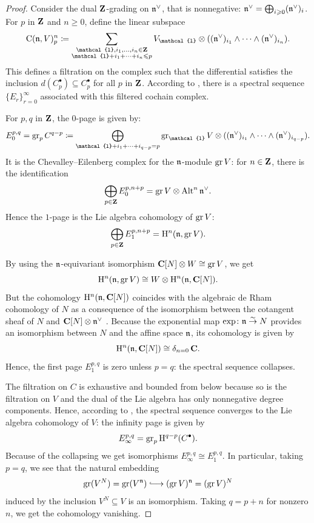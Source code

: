 \begin{proof}
	Consider the dual $\mathbf{Z}$-grading on $\mathfrak n^\vee$, that is nonnegative: $\mathfrak n^\vee = \bigoplus_{i \geqslant 0} (\mathfrak n^\vee)_i$. For $p$ in $\mathbf{Z}$ and $n \geqslant 0$, define the linear subspace
	$$ \Cpx(\n, V)^n_p \coloneqq \sum_{\substack{\mathcal{l}, i_1, \dots, i_n \in \Z \\ \mathcal{l} + i_1 + \cdots + i_n \leqslant p}} V_{\mathcal{l}} \otimes ((\n^\vee)_{i_1} \wedge \cdots\wedge (\n^\vee)_{i_n}). $$ 
	This defines a filtration on the complex such that the differential satisfies the inclusion $d(C^\bullet_p) \subseteq C^\bullet_p$ for all $p$ in $\mathbf{Z}$. According to \cite[Section~5.4]{weibel1994introduction}, there is a spectral sequence~$\{E_{r}\}_{r=0}^\infty$ associated with this filtered cochain complex.	
	
	For $p, q$ in $\mathbf{Z}$, the $0$-page is given by:
	$$ E_0^{p, q} = \gr_p C^{q-p} \coloneqq \bigoplus_{\mathcal{l} + i_1 + \cdots + i_{q-p} = p} \gr_\mathcal{l} V \otimes ((\n^\vee)_{i_1} \wedge \cdots\wedge(\n^\vee)_{i_{q-p}}). $$
	It is the Chevalley--Eilenberg complex for the $\mathfrak n$-module $\operatorname{gr} V$: for $n \in \mathbf{Z}$, there is the identification
	$$ \bigoplus_{p \in \mathbf{Z}}  E_0^{p, n+p} = \operatorname{gr} V \otimes \operatorname{Alt}^n \mathfrak n^\vee. $$
	Hence the $1$-page is the Lie algebra cohomology of $\operatorname{gr} V$:
	$$  \bigoplus_{p \in \mathbf{Z}}  E_1^{p, n+p} = \mathrm{H}^{n}(\mathfrak n, \operatorname{gr} V). $$ 
	
	By using the $\mathfrak n$-equivariant isomorphism $\mathbf{C}[N] \otimes W \cong \operatorname{gr} V$, we get
	$$ \mathrm{H}^{n}(\mathfrak n, \operatorname{gr} V) \cong W \otimes \mathrm{H}^{n}(\mathfrak n, \mathbf{C}[N]). $$
	But the cohomology $\mathrm{H}^{n}(\mathfrak n, \mathbf{C}[N])$ coincides with the algebraic de Rham cohomology of $N$ as a consequence of the isomorphism between the cotangent sheaf of $N$ and $\mathbf{C}[N] \otimes \mathfrak n^\vee$ \cite[Proposition 4.4.2]{springer2009linear}. Because the exponential map $\exp \colon \mathfrak n \overset{\sim}{\rightarrow} N$ provides an isomorphism between $N$ and the affine space $\mathfrak n$, its cohomology is given by
	$$ \mathrm{H}^{n}(\mathfrak n, \mathbf{C}[N]) \cong \delta_{n = 0} \, \mathbf{C}. $$
	Hence, the first page $E_1^{p, q}$ is zero unless $p=q$: the spectral sequence collapses.
	
	The filtration on $C$ is exhaustive and bounded from below because so is the filtration on $V$ and the dual of the Lie algebra has only nonnegative degree components. Hence, according to \cite[Theorem 5.5.1]{weibel1994introduction}, the spectral sequence converges to the Lie algebra cohomology of $V$: the infinity page is given by
	$$ E_\infty^{p, q} = \operatorname{gr}_p \mathrm{H}^{q-p}(C^\bullet). $$	
	Because of the collapsing we get isomorphisms $E_\infty^{p, q} \cong E_1^{p, q}$. In particular, taking $p=q$, we see that the natural embedding
	$$  \gr (V^N) = \gr (V^\n) \hooklongrightarrow (\gr V)^\n = (\gr V)^N$$
	induced by the inclusion $V^N \subseteq V$ is an isomorphism. Taking $q = p + n$ for nonzero $n$, we get the cohomology vanishing.
\end{proof}

